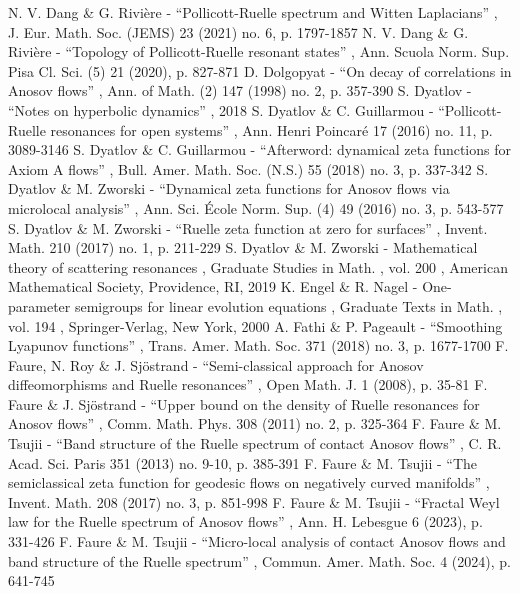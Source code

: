  N. V. Dang \& G. Rivière - “Pollicott-Ruelle spectrum and Witten Laplacians” , J. Eur. Math. Soc. (JEMS) 23 (2021) no. 6, p. 1797-1857
 N. V. Dang \& G. Rivière - “Topology of Pollicott-Ruelle resonant states” , Ann. Scuola Norm. Sup. Pisa Cl. Sci. (5) 21 (2020), p. 827-871
 D. Dolgopyat - “On decay of correlations in Anosov flows” , Ann. of Math. (2) 147 (1998) no. 2, p. 357-390
 S. Dyatlov - “Notes on hyperbolic dynamics” , 2018
 S. Dyatlov \& C. Guillarmou - “Pollicott-Ruelle resonances for open systems” , Ann. Henri Poincaré 17 (2016) no. 11, p. 3089-3146
 S. Dyatlov \& C. Guillarmou - “Afterword: dynamical zeta functions for Axiom A flows” , Bull. Amer. Math. Soc. (N.S.) 55 (2018) no. 3, p. 337-342
 S. Dyatlov \& M. Zworski - “Dynamical zeta functions for Anosov flows via microlocal analysis” , Ann. Sci. École Norm. Sup. (4) 49 (2016) no. 3, p. 543-577
 S. Dyatlov \& M. Zworski - “Ruelle zeta function at zero for surfaces” , Invent. Math. 210 (2017) no. 1, p. 211-229
 S. Dyatlov \& M. Zworski - Mathematical theory of scattering resonances , Graduate Studies in Math. , vol. 200 , American Mathematical Society, Providence, RI, 2019
 K. Engel \& R. Nagel - One-parameter semigroups for linear evolution equations , Graduate Texts in Math. , vol. 194 , Springer-Verlag, New York, 2000
 A. Fathi \& P. Pageault - “Smoothing Lyapunov functions” , Trans. Amer. Math. Soc. 371 (2018) no. 3, p. 1677-1700
 F. Faure, N. Roy \& J. Sjöstrand - “Semi-classical approach for Anosov diffeomorphisms and Ruelle resonances” , Open Math. J. 1 (2008), p. 35-81
 F. Faure \& J. Sjöstrand - “Upper bound on the density of Ruelle resonances for Anosov flows” , Comm. Math. Phys. 308 (2011) no. 2, p. 325-364
 F. Faure \& M. Tsujii - “Band structure of the Ruelle spectrum of contact Anosov flows” , C. R. Acad. Sci. Paris 351 (2013) no. 9-10, p. 385-391
 F. Faure \& M. Tsujii - “The semiclassical zeta function for geodesic flows on negatively curved manifolds” , Invent. Math. 208 (2017) no. 3, p. 851-998
 F. Faure \& M. Tsujii - “Fractal Weyl law for the Ruelle spectrum of Anosov flows” , Ann. H. Lebesgue 6 (2023), p. 331-426
 F. Faure \& M. Tsujii - “Micro-local analysis of contact Anosov flows and band structure of the Ruelle spectrum” , Commun. Amer. Math. Soc. 4 (2024), p. 641-745
